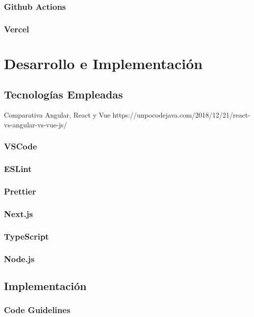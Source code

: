 \documentclass[12pt,twoside,titlepage]{report}
\begin{document}
\subsubsection{Github Actions}
\subsubsection{Vercel}

\section{Desarrollo e Implementación}

\subsection{Tecnologías Empleadas}

Comparativa Angular, React y Vue
https://unpocodejava.com/2018/12/21/react-vs-angular-vs-vue-js/

\subsubsection{VSCode}
\subsubsection{ESLint}
\subsubsection{Prettier}

\subsubsection{Next.js}

\subsubsection{TypeScript}

\subsubsection{Node.js}



\subsection{Implementación}

\subsubsection{Code Guidelines}
\end{document}
